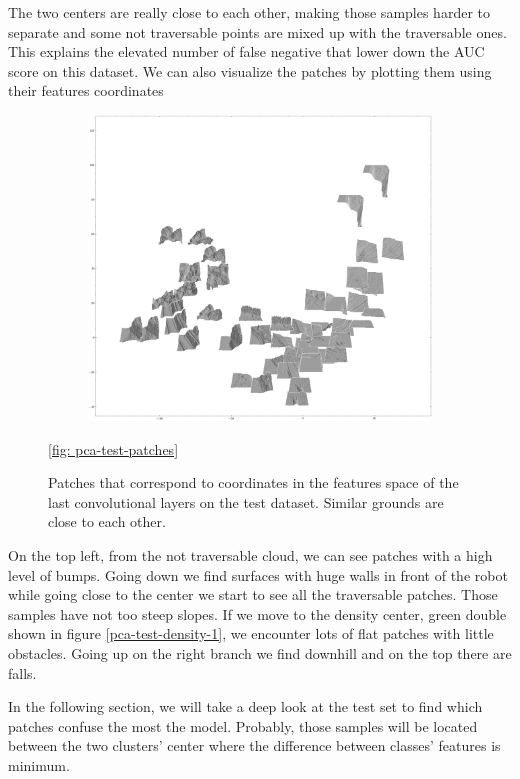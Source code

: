 \documentclass[../document.tex]{subfiles}
\begin{document}
The two centers are really close to each other, making those samples harder to separate and some not traversable points are mixed up with the traversable ones. This explains the elevated number of false negative that lower down the AUC score on this dataset. We can also visualize the patches by plotting them using their features coordinates
\begin{figure} [htbp]
    \centering
    \begin{subfigure}[b]{1\textwidth}
        \includegraphics[width=\linewidth]{../img/5/pca/pca-test-patches-50-None.png}
    \end{subfigure}
\caption{Patches that correspond to coordinates in the features space of the last convolutional layers on the test dataset. Similar grounds are close to each other.}
\ref{fig: pca-test-patches}
\end{figure}
On the top left, from the not traversable cloud, we can see patches with a high level of bumps. Going down we find surfaces with huge walls in front of the robot while going close to the center we start to see all the traversable patches. Those samples have not too steep slopes. If we move to the density center, green double shown in figure \ref{pca-test-density-1}, we encounter lots of flat patches with little obstacles. Going up on the right branch we find downhill and on the top there are falls. 

In the following section, we will take a deep look at the test set to find which patches confuse the most the model. Probably, those samples will be located between the two clusters' center where the difference between classes' features is minimum. 



\end{document}
